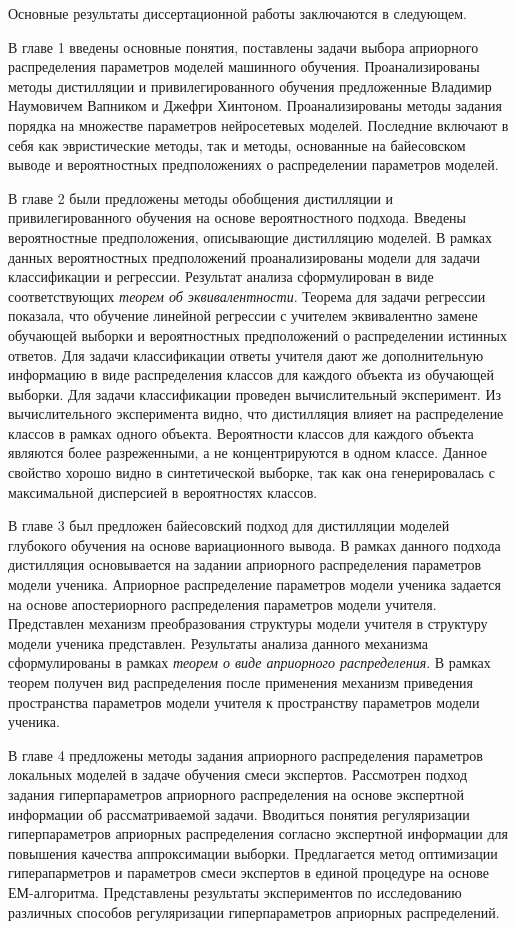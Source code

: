 Основные результаты диссертационной работы заключаются в следующем.

В главе 1 введены основные понятия, поставлены задачи выбора априорного распределения параметров моделей машинного обучения. Проанализированы методы дистилляции и привилегированного обучения предложенные Владимир Наумовичем Вапником и Джефри Хинтоном. Проанализированы методы задания порядка на множестве параметров нейросетевых моделей. Последние включают в себя как эвристические методы, так и методы, основанные на байесовском выводе и вероятностных предположениях о распределении параметров моделей.

В главе 2 были предложены методы обобщения дистилляции и привилегированного обучения на основе вероятностного подхода. Введены вероятностные предположения, описывающие дистилляцию моделей. В рамках данных вероятностных предположений проанализированы модели для задачи классификации и регрессии. Результат анализа сформулирован в виде  соответствующих \emph{теорем об эквивалентности}. Теорема для задачи регрессии показала, что обучение линейной регрессии с учителем эквивалентно замене обучающей выборки и вероятностных предположений о распределении истинных ответов. Для задачи классификации ответы учителя дают же дополнительную информацию в виде распределения классов для каждого объекта из обучающей выборки. Для задачи классификации проведен вычислительный эксперимент. Из вычислительного эксперимента видно, что дистилляция влияет на распределение классов в рамках одного объекта. Вероятности классов для каждого объекта являются более разреженными, а не концентрируются в одном классе. Данное свойство хорошо видно в синтетической выборке, так как она генерировалась с максимальной дисперсией в вероятностях классов.

В главе 3 был предложен байесовский подход для дистилляции моделей глубокого обучения на основе вариационного вывода. В рамках данного подхода дистилляция основывается на задании априорного распределения параметров модели ученика. Априорное распределение параметров модели ученика задается на основе апостериорного распределения параметров модели учителя. Представлен механизм преобразования структуры модели учителя в структуру модели ученика представлен. Результаты анализа данного механизма сформулированы в рамках \emph{теорем о виде априорного распределения}. В рамках теорем получен вид распределения после применения механизм приведения пространства параметров модели учителя к пространству параметров модели ученика.

В главе 4 предложены методы задания априорного распределения параметров локальных моделей в задаче обучения смеси экспертов. Рассмотрен подход задания гиперпараметров априорного распределения на основе экспертной информации об рассматриваемой задачи. Вводиться понятия регуляризации гиперпараметров априорных распределения согласно экспертной информации для повышения качества аппроксимации выборки. Предлагается метод оптимизации гиперапарметров и параметров смеси экспертов в единой процедуре на основе ЕМ-алгоритма. Представлены результаты экспериментов по исследованию различных способов регуляризации гиперпараметров априорных распределений.

